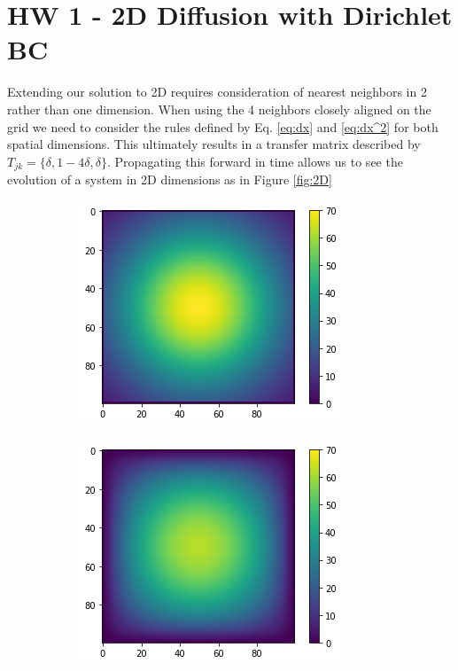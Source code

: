 \documentclass[]{article}
\begin{document}
\section{HW 1 - 2D Diffusion with Dirichlet BC}
\label{sec:HW1_2D}
Extending our solution to 2D requires consideration of nearest neighbors in 2 rather than one dimension.  When using the 4 neighbors closely aligned on the grid we need to consider the rules defined by Eq. \ref{eq:dx} and \ref{eq:dx^2} for both spatial dimensions. This ultimately results in a transfer matrix described by $T_{jk} = \{\delta,1-4\delta,\delta\}$. Propagating this forward in time allows us to see the evolution of a system in 2D dimensions as in Figure \ref{fig:2D}
\begin{figure}
	\begin{subfigure}{.5\textwidth}
		\centering
		\includegraphics[width=.8\linewidth]{figures/2D_Diffusion_DirBound0_init.png}
		\caption{}
	\end{subfigure}%
	\begin{subfigure}{.5\textwidth}
		\centering
		\includegraphics[width=.8\linewidth]{figures/2D_Diffusion_DirBound0_end.png}

\end{subfigure}
\end{figure}
\end{document}
